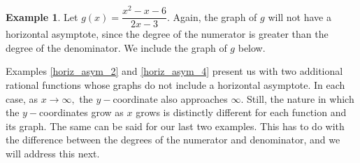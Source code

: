 \documentclass[12pt]{book}
\theoremstyle{definition}
\newtheorem{example}{Example}
\begin{document}
\begin{example}\label{horiz_asym_6}
Let $g(x)=\dfrac{x^2-x-6}{2x-3}$.  Again, the graph of $g$ will not have a horizontal asymptote, since the degree of the numerator is greater than the degree of the denominator.  We include the graph of $g$ below.
\begin{center}
\end{center}
\end{example}

Examples \ref{horiz_asym_2} and \ref{horiz_asym_4} present us with two additional rational functions whose graphs do not include a horizontal asymptote.  In each case, as $x\rightarrow\infty,$ the $y-$coordinate also approaches $\infty$.  Still, the nature in which the $y-$coordinates grow as $x$ grows is distinctly different for each function and its graph.  The same can be said for our last two examples.  This has to do with the difference between the degrees of the numerator and denominator, and we will address this next.
\end{document}
